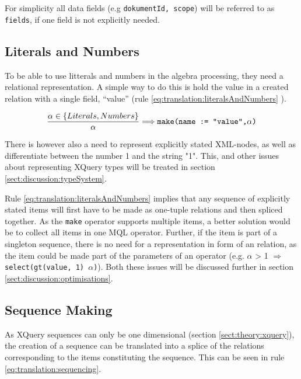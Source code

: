 For simplicity all data fields (e.g \texttt{dokumentId, scope}) will be
referred to as \verb!fields!, if one field is not explicitly needed.

\subsection{Literals and Numbers}
\label{sect:translation:litAndNumbers}
To be able to use litterals and numbers in the algebra processing, they need a
relational representation. A simple way to do this is hold the value in a
created relation with a single field, ``value'' (rule
\ref{eq:translation:literalsAndNumbers} ).

\begin{equation}
\centering
\frac{\alpha \in \left\{ Literals, Numbers \right\} }{\alpha}
\Longrightarrow
\texttt{make(name := "value",} \alpha \texttt{)}
\label{eq:translation:literalsAndNumbers}
\end{equation}

There is however also a need to represent explicitly stated XML-nodes, as well
as differentiate between the number \textsf{1} and the string \textsf{"1"}.
This, and other issues about representing XQuery types will be treated in
section \ref{sect:discussion:typeSystem}.

Rule \ref{eq:translation:literalsAndNumbers} implies that any sequence of
explicitly stated items will first have to be made as one-tuple relations and
then spliced together. As the \texttt{make} operator supports multiple items, a
better solution would be to collect all items in one MQL operator. Further, if
the item is part of a singleton sequence, there is no need for a representation
in form of an relation, as the item could be made part of the parameters of an
operator (e.g. $\alpha$ \textsf{> 1} $\Longrightarrow$
\texttt{select(gt(value, 1) $\alpha$)}). Both these issues will be discussed
further in section \ref{sect:discussion:optimisations}.



\subsection{Sequence Making}
\label{sect:translation:sequencing}
As XQuery sequences can only be one dimensional (section
\ref{sect:theory:xquery}), the creation of a sequence can be translated into a
splice of the relations corresponding to the items constituting the sequence.
This can be seen in rule \ref{eq:translation:sequencing}. 

